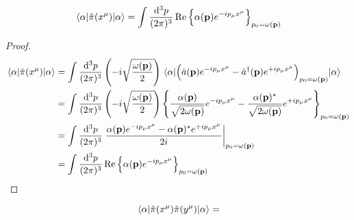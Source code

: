\begin{lemma}
	\begin{equation}
		\expval{\hat\pi(x^\mu)}{\alpha}
		=
		\int\frac{\dd[3]{p}}{(2\pi)^3}
		\operatorname{\operatorname{Re}}\left\{
			\alpha(\vb{p})
			e^{-ip_\mu x^\mu}
		\right\}_{p_0=\omega(\vb{p})}
	\end{equation}
\end{lemma}
\begin{proof}
	\begin{equation*}
		\begin{split}
			\expval{\hat\pi(x^\mu)}{\alpha}
			&=
			\int\frac{\dd[3]{p}}{(2\pi)^3}
			\left(
				-i
				\sqrt{\frac{\omega(\vb{p})}{2}}
			\right)
			\expval{
				\left(
					\hat{a}(\vb{p})
					e^{-ip_\mu x^\mu}
					-
					\hat{a}^\dagger(\vb{p})
					e^{+ip_\mu x^\mu}
				\right)_{p_0=\omega(\vb{p})}
			}{\alpha}
			\\
			&=
			\int\frac{\dd[3]{p}}{(2\pi)^3}
			\left(
				-i
				\sqrt{\frac{\omega(\vb{p})}{2}}
			\right)
			\left\{
				\frac{\alpha(\vb{p})}{\sqrt{2\omega(\vb{p})}}
				e^{-ip_\mu x^\mu}
				-
				\frac{\alpha(\vb{p})^*}{\sqrt{2\omega(\vb{p})}}
				e^{+ip_\mu x^\mu}
			\right\}_{p_0=\omega(\vb{p})}
			\\
			&=
			\int\frac{\dd[3]{p}}{(2\pi)^3}
			\eval{
				\frac{
					\alpha(\vb{p})
					e^{-ip_\mu x^\mu}
					-
					\alpha(\vb{p})^*
					e^{+ip_\mu x^\mu}
				}{2i}
			}_{p_0=\omega(\vb{p})}
			\\
			&=
			\int\frac{\dd[3]{p}}{(2\pi)^3}
			\Re\left\{
				\alpha(\vb{p})
				e^{-ip_\mu x^\mu}
			\right\}_{p_0=\omega(\vb{p})}
		\end{split}
	\end{equation*}
\end{proof}
\begin{lemma}
	\begin{equation}
		\expval{\hat\pi(x^\mu)\hat\pi(y^\mu)}{\alpha}
		=
	\end{equation}
\end{lemma}
